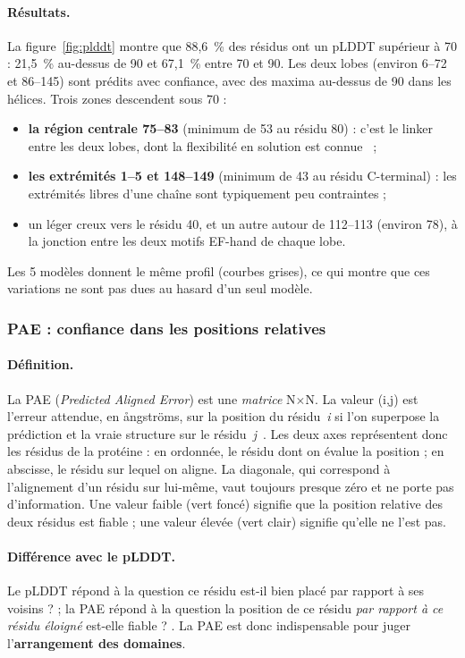 \paragraph{Résultats.} La figure~\ref{fig:plddt} montre que 88,6~\% des résidus ont un pLDDT supérieur à 70 : 21,5~\% au-dessus de 90 et 67,1~\% entre 70 et 90. Les deux lobes (environ 6–72 et 86–145) sont prédits avec confiance, avec des maxima au-dessus de 90 dans les hélices. Trois zones descendent sous 70 :
\begin{itemize}
  \item \textbf{la région centrale 75–83} (minimum de 53 au résidu 80) : c'est le linker entre les deux lobes, dont la flexibilité en solution est connue~\cite{barbato1992} ;
  \item \textbf{les extrémités 1–5 et 148–149} (minimum de 43 au résidu C-terminal) : les extrémités libres d'une chaîne sont typiquement peu contraintes ;
  \item un léger creux vers le résidu 40, et un autre autour de 112–113 (environ 78), à la jonction entre les deux motifs EF-hand de chaque lobe.
\end{itemize}
Les 5 modèles donnent le même profil (courbes grises), ce qui montre que ces variations ne sont pas dues au hasard d'un seul modèle.

\subsubsection{PAE : confiance dans les positions relatives}

\paragraph{Définition.} La PAE (\emph{Predicted Aligned Error}) est une \emph{matrice} N$\times$N. La valeur (i,j) est l'erreur attendue, en ångströms, sur la position du résidu~\emph{i} si l'on superpose la prédiction et la vraie structure sur le résidu~\emph{j}~\cite{ebi_course}. Les deux axes représentent donc les résidus de la protéine : en ordonnée, le résidu dont on évalue la position ; en abscisse, le résidu sur lequel on aligne. La diagonale, qui correspond à l'alignement d'un résidu sur lui-même, vaut toujours presque zéro et ne porte pas d'information. Une valeur faible (vert foncé) signifie que la position relative des deux résidus est fiable ; une valeur élevée (vert clair) signifie qu'elle ne l'est pas.

\paragraph{Différence avec le pLDDT.} Le pLDDT répond à la question \og ce résidu est-il bien placé par rapport à ses voisins ? \fg{} ; la PAE répond à la question \og la position de ce résidu \emph{par rapport à ce résidu éloigné} est-elle fiable ? \fg{}. La PAE est donc indispensable pour juger l'\textbf{arrangement des domaines}.

